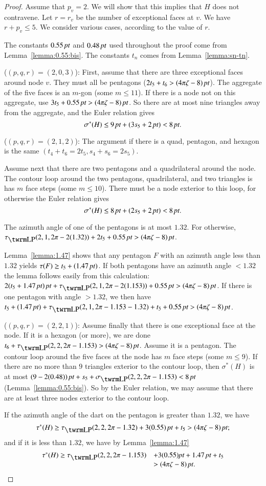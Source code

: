 \begin{proof}
Assume that $p_v=2$.  We will show that this implies that $H$ does
not contravene.  Let $r=r_v$ be the number of exceptional faces at
$v$. We have $r+p_v\le5$.  We consider various cases, according to
the value of $r$.

The constants $0.55\,\hbox{\it pt}$ and $0.48\,\hbox{\it pt}$ used throughout the
proof come from Lemma~\ref{lemma:0.55:bis}. The constants $t_n$
comes from Lemma~\ref{lemma:sn-tn}.

($(p,q,r)=(2,0,3)$): First, assume that there are three exceptional
faces around node $v$. They must all be pentagons
($2t_5+t_6>(4\pi\zeta-8)\,\hbox{\it pt}$). The aggregate of the five faces is an
$m$-gon (some $m\le11$).  If there is a node not on this aggregate,
use $3t_5+0.55\,\hbox{\it pt}>(4\pi\zeta-8)\,\hbox{\it pt}$. So there are at most nine triangles
away from the aggregate, and the Euler relation gives
    $$
    \sigma^*(H) \le 9\,\hbox{\it pt} + (3 s_5+2\,\hbox{\it pt}) < 8\,\hbox{\it pt}.
    $$

($(p,q,r)=(2,1,2)$): The argument if there is a quad, pentagon, and
hexagon is the same $(t_4+t_6=2t_5,s_4+s_6=2s_5)$.

Assume next that there are two pentagons and a quadrilateral around
the node. The contour loop around the two pentagons, quadrilateral,
and two triangles is has $m$ face steps (some $m\le10$). There must
be a node exterior to this loop, for otherwise the Euler relation
gives
    $$
    \sigma^*(H) \le 8\,\hbox{\it pt}+(2s_5+2\,\hbox{\it pt})<8\,\hbox{\it pt}.
    $$

The azimuth angle of one of the pentagons is at most $1.32$.  For
otherwise, $\tauLP(2,1,2\pi-2(1.32))+2t_5+0.55\,\pt>\squander$.

Lemma~\ref{lemma:1.47} shows that any pentagon $F$ with an azimuth
angle less than $1.32$ yields $\tau(F)\ge t_5+ (1.47\,\hbox{\it pt})$. If both
pentagons have an azimuth angle $<1.32$ the lemma follows easily
from this calculation:
    $2(t_5+1.47\,\pt)\,\pt+\tauLP(2,1,2\pi-2(1.153))+0.55\,\pt>\squander$.
If there is one pentagon with angle $>1.32$, we then have
    $t_5+(1.47\,\pt)+\tauLP(2,1,2\pi-1.153-1.32)+t_5+0.55\,\pt>\squander$.


($(p,q,r)=(2,2,1)$): Assume finally that there is one exceptional
face at the node. If it is a hexagon (or more), we are done
$t_6+\tauLP(2,2,2\pi-1.153)>\squander$. Assume it is a pentagon. The
contour loop around the five faces at the node has $m$ face steps
(some $m\le9$). If there are no more than $9$ triangles exterior to
the contour loop, then $\sigma^*(H)$ is at most
$(9-2(0.48))\,\pt+s_5+\sLP(2,2,2\pi-1.153)<8\,\pt$
(Lemma~\ref{lemma:0.55:bis}). So by the Euler relation, we may
assume that there are at least three nodes exterior to the contour
loop.

If the azimuth angle of the dart on the pentagon is greater than
$1.32$, we have
  $$\tau^*(H)\ge\tauLP(2,2,2\pi-1.32) +3(0.55)\,\pt +t_5 > \squander;$$
and if it is less than $1.32$, we have by Lemma~\ref{lemma:1.47}
    $$
    \begin{array}{lll}
        \tau^*(H)\ge\tauLP(2,2,2\pi-1.153)&+3(0.55)\pt+1.47\,\pt+t_5 \\
            &> \squander.
    \end{array}
    $$
\end{proof}

